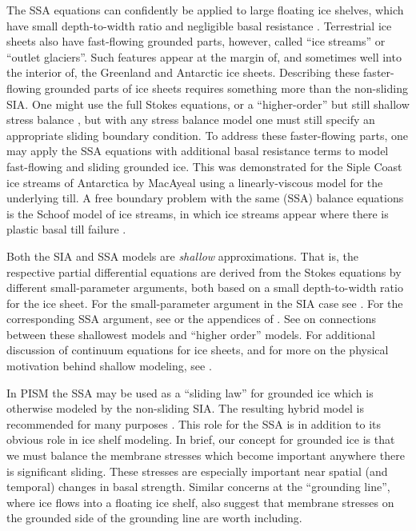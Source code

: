 \documentclass[titlepage,letterpaper,final]{scrartcl}
\begin{document}
The SSA equations can confidently be applied to large floating ice shelves, which have small depth-to-width ratio and negligible basal resistance \cite{Morland,MorlandZainuddin}.  Terrestrial ice sheets also have fast-flowing grounded parts, however, called ``ice streams'' or ``outlet glaciers''.  Such features appear at the margin of, and sometimes well into the interior of, the Greenland \cite{Joughinetal2001} and Antarctic \cite{BamberVaughanJoughin} ice sheets.  Describing these faster-flowing grounded parts of ice sheets requires something more than the non-sliding SIA.  One might use the full Stokes equations, or a ``higher-order'' but still shallow stress balance \cite{Blatter,Pattyn03}, but with any stress balance model one must still specify an appropriate sliding boundary condition.  To address these faster-flowing parts, one may apply the SSA equations with additional basal resistance terms to model fast-flowing and sliding grounded ice.  This was demonstrated for the Siple Coast ice streams of Antarctica by MacAyeal \cite{MacAyeal} using a linearly-viscous model for the underlying till.  A free boundary problem with the same (SSA) balance equations is the Schoof \cite{SchoofStream} model of ice streams, in which ice streams appear where there is plastic basal till failure \cite{Paterson}.

Both the SIA and SSA models are \emph{shallow} approximations.  That is, the respective partial differential equations are derived from the Stokes equations by different small-parameter arguments, both based on a small depth-to-width ratio for the ice sheet.  For the small-parameter argument in the SIA case see \cite{Fowler}.  For the corresponding SSA argument, see \cite{WeisGreveHutter} or the appendices of \cite{SchoofStream}.  See \cite{SchoofHindmarsh} on connections between these shallowest models and ``higher order'' models.  For additional discussion of continuum equations for ice sheets, and for more on the physical motivation behind shallow modeling, see \cite{GreveBlatter2009}.

In PISM the SSA may be used as a ``sliding law'' for grounded ice which is otherwise modeled by the non-sliding SIA.  The resulting hybrid model is recommended for many purposes \cite{BBssasliding,BKAJS}.  This role for the SSA is in addition to its obvious role in ice shelf modeling.  In brief, our concept for grounded ice is that we must balance the membrane stresses which become important anywhere there is significant sliding.  These stresses are especially important near spatial (and temporal) changes in basal strength.  Similar concerns at the ``grounding line'', where ice flows into a floating ice shelf, also suggest that membrane stresses on the grounded side of the grounding line are worth including.
\end{document}
